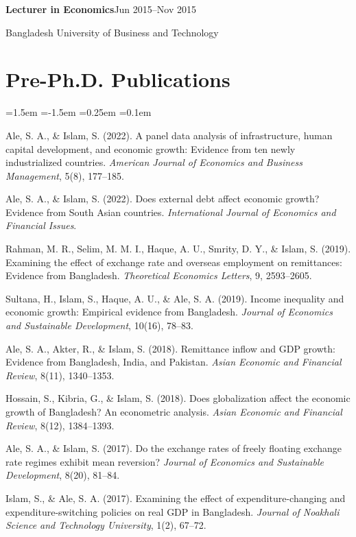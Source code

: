 \documentclass[11pt]{article}
\newcommand{\cvitem}[2]{%
  \textbf{#1}\hfill #2\par\nopagebreak
}
\newenvironment{publist}
  {\begin{list}{}{\leftmargin=1.5em \itemindent=-1.5em \itemsep=0.25em \topsep=0.1em}\interlinepenalty=10000}
  {\end{list}}
\begin{document}
\cvitem{Lecturer in Economics}{Jun 2015--Nov 2015}
Bangladesh University of Business and Technology

\section*{Pre-Ph.D. Publications}
\begin{publist}
  \item Ale, S. A., \& Islam, S. (2022). A panel data analysis of infrastructure, human capital
    development, and economic growth: Evidence from ten newly industrialized countries.
    \textit{American Journal of Economics and Business Management}, 5(8), 177--185.
  \item Ale, S. A., \& Islam, S. (2022). Does external debt affect economic growth? Evidence from
    South Asian countries. \textit{International Journal of Economics and Financial Issues}.
  \item Rahman, M. R., Selim, M. M. I., Haque, A. U., Smrity, D. Y., \& Islam, S. (2019).
    Examining the effect of exchange rate and overseas employment on remittances: Evidence
    from Bangladesh. \textit{Theoretical Economics Letters}, 9, 2593--2605.
  \item Sultana, H., Islam, S., Haque, A. U., \& Ale, S. A. (2019). Income inequality and
    economic growth: Empirical evidence from Bangladesh. \textit{Journal of Economics and
    Sustainable Development}, 10(16), 78--83.
  \item Ale, S. A., Akter, R., \& Islam, S. (2018). Remittance inflow and GDP growth: Evidence
    from Bangladesh, India, and Pakistan. \textit{Asian Economic and Financial Review}, 8(11),
    1340--1353.
  \item Hossain, S., Kibria, G., \& Islam, S. (2018). Does globalization affect the economic
    growth of Bangladesh? An econometric analysis. \textit{Asian Economic and Financial
    Review}, 8(12), 1384--1393.
  \item Ale, S. A., \& Islam, S. (2017). Do the exchange rates of freely floating exchange rate
    regimes exhibit mean reversion? \textit{Journal of Economics and Sustainable Development},
    8(20), 81--84.
  \item Islam, S., \& Ale, S. A. (2017). Examining the effect of expenditure-changing and
    expenditure-switching policies on real GDP in Bangladesh. \textit{Journal of Noakhali
    Science and Technology University}, 1(2), 67--72.
\end{publist}
\end{document}

